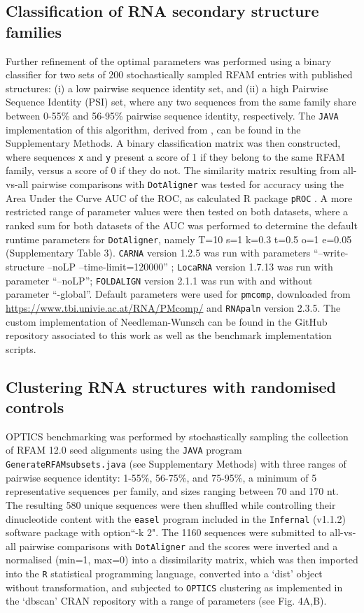 \documentclass{bmcart}
\newcommand\dotaligner{\texttt{DotAligner}}
\newcommand\locarna{\texttt{LocaRNA}}
\newcommand\foldalign{\texttt{FOLDALIGN}}
\newcommand\carna{\texttt{CARNA}}
\begin{document}
\subsection*{Classification of RNA secondary structure families}
Further refinement of the optimal parameters was performed using a binary classifier for two sets of 
200 stochastically sampled RFAM entries with published structures: 
(i) a low pairwise sequence identity set, and (ii) a high Pairwise Sequence Identity (PSI) set, 
where any two sequences from the same family share between 0-55\% and 56-95\% pairwise sequence identity, respectively. The \texttt{JAVA} implementation of this algorithm, derived from \cite{smith2013widespread}, can be found in the Supplementary Methods. 
A binary classification matrix was then constructed, where sequences \texttt{x} and \texttt{y}
present a score of 1 if they belong to the same RFAM family, versus a score of 0 if they do not. 
The similarity matrix resulting from all-vs-all pairwise comparisons with \dotaligner{} was tested for 
accuracy using the Area Under the Curve AUC of the ROC, as calculated R package \texttt{pROC} \cite{robin2011proc}. 
A more restricted range of parameter values were then tested on both datasets, where a ranked sum for both datasets of the AUC was performed to determine the default runtime parameters for \dotaligner{}, namely T=10 s=1 k=0.3 t=0.5 o=1 e=0.05 (Supplementary Table 3). \carna{} version 1.2.5 was run with parameters ``--write-structure --noLP --time-limit=120000'' ;  \locarna{} version 1.7.13 was run with parameter ``--noLP''; \foldalign{} version 2.1.1 was run with and without parameter ``-global''. Default parameters were used for \texttt{pmcomp}, downloaded from \url{https://www.tbi.univie.ac.at/RNA/PMcomp/} and \texttt{RNApaln} version 2.3.5. The custom implementation of Needleman-Wunsch can be found in the GitHub repository associated to this work as well as the benchmark implementation scripts. 

\subsection*{Clustering RNA structures with randomised controls}
OPTICS benchmarking was performed by stochastically sampling the collection of RFAM 12.0 
seed alignments using the \texttt{JAVA} program \texttt{GenerateRFAMsubsets.java} (see Supplementary Methods) with three ranges of pairwise sequence identity: 1-55\%, 56-75\%, and 75-95\%, a minimum of 5 representative sequences per family, and sizes ranging between 70 and 170 nt.   
The resulting 580 unique sequences were then shuffled while controlling their dinucleotide content with 
the \texttt{easel} program included in the \texttt{Infernal} (v1.1.2) software package 
\cite{nawrocki2013infernal} with option``-k 2". The 1160 sequences were submitted to 
all-vs-all pairwise comparisons with \dotaligner{} and the scores were inverted and a 
normalised (min=1, max=0) into a dissimilarity matrix, which was then imported into
the \texttt{R} statistical programming language, converted into a `dist' object without
transformation, and subjected to \texttt{OPTICS} clustering as implemented
in the `dbscan' CRAN repository with a range of parameters (see Fig. 4A,B).\\
\end{document}
